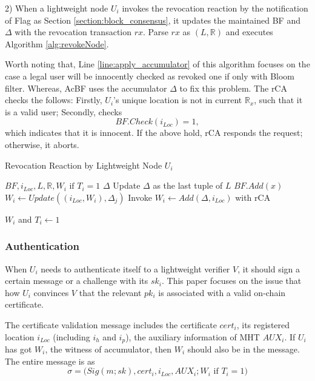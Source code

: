 \documentclass[conference]{IEEEtran}
\begin{document}
2) When a lightweight node $U_i$ invokes the revocation reaction by the notification of Flag as Section \ref{section:block_consensus}, it updates the maintained BF and $\Delta$ with the revocation transaction $rx$. Parse $rx$ as $(L, \mathbb{R})$ and executes Algorithm \ref{alg:revokeNode}.

Worth noting that, Line \ref{line:apply_accumulator} of this algorithm focuses on the case a legal user will be innocently checked as revoked one if only with Bloom filter. Whereas, AcBF uses the accumulator $\Delta$ to fix this problem. 
The rCA checks the follows: Firstly, $U_i$'s unique location is not in current $\mathbb{R}_x$, such that it is a valid user; Secondly, checks 
$$BF.Check(i_{Loc}) = 1,$$
which indicates that it is innocent. If the above hold, rCA responds the request; otherwise, it aborts.

\begin{algorithm}[t]
	\renewcommand{\algorithmicensure}{\textbf{Output:}}
	\caption{Revocation Reaction by Lightweight Node $U_i$}\label{alg:revokeNode}
	\begin{algorithmic}[1]
		\Require $BF, i_{Loc}, L, \mathbb{R}, W_i \text{ if } T_i=1$
		\Ensure $\Delta$
		\State Update $\Delta$ as the last tuple of $L$
		\EndIf
		\State $BF.Add(x)$ 
		\EndFor
		\State $W_i\gets Update((i_{Loc}, W_i), \Delta_j)$ 
		\EndFor
		\State Invoke $W_i \gets Add(\Delta, i_{Loc})$ with rCA \label{line:apply_accumulator}
		
		\Return $W_i$ and $T_i \gets 1$
		\EndIf
	\end{algorithmic}
\end{algorithm}

\subsubsection{Authentication}\label{section:authentication}
When $U_i$ needs to authenticate itself to a lightweight verifier $V$, it should sign a certain message or a challenge with its $sk_i$. This paper focuses on the issue that how $U_i$ convinces $V$ that the relevant $pk_i$ is associated with a valid on-chain certificate.

The certificate validation message includes the certificate $cert_i$, its registered location $i_{Loc}$ (including $i_h$ and $i_p$), the auxiliary information of MHT $AUX_i$. If $U_i$ has got $W_i$, the witness of accumulator, then $W_i$ should also be in the message. The entire message is as 
$$\sigma = \biggl(Sig(m; sk), cert_i, i_{Loc}, AUX_i; W_i \text{ if } T_i =1 \biggr)$$
\end{document}

